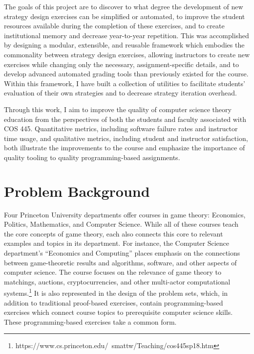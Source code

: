 \documentclass[pageno]{jpaper}
\begin{document}
The goals of this project are to discover to what degree the development of new strategy design exercises can be simplified or automated, to improve the student resources available during the completion of these exercises, and to create institutional memory and decrease year-to-year repetition.
This was accomplished by designing a modular, extensible, and reusable framework which embodies the commonality between strategy design exercises, allowing instructors to create new exercises while changing only the necessary, assignment-specific details, and to develop advanced automated grading tools than previously existed for the course.
Within this framework, I have built a collection of utilities to facilitate students' evaluation of their own strategies and to decrease strategy iteration overhead.

Through this work, I aim to improve the quality of computer science theory education from the perspectives of both the students and faculty associated with COS 445.
Quantitative metrics, including software failure rates and instructor time usage, and qualitative metrics, including student and instructor satisfaction, both illustrate the improvements to the course and emphasize the importance of quality tooling to quality programming-based assignments.

\section*{Problem Background}
Four Princeton University departments offer courses in game theory: Economics, Politics, Mathematics, and Computer Science.
While all of these courses teach the core concepts of game theory, each also connects this core to relevant examples and topics in its department.
For instance, the Computer Science department's ``Economics and Computing'' places emphasis on the connections between game-theoretic results and algorithms, software, and other aspects of computer science.
The course focuses on the relevance of game theory to matchings, auctions, cryptocurrencies, and other multi-actor computational systems.\footnote{https://www.cs.princeton.edu/~smattw/Teaching/cos445sp18.htm}
It is also represented in the design of the problem sets, which, in addition to traditional proof-based exercises, contain programming-based exercises which connect course topics to prerequisite computer science skills.
These programming-based exercises take a common form.
\end{document}

